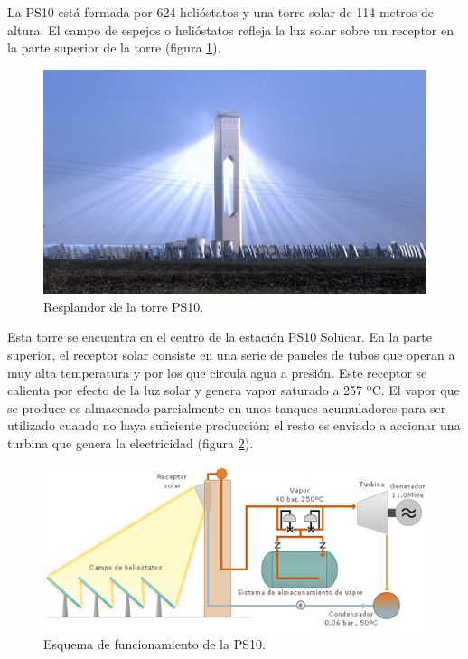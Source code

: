 La PS10 está formada por 624 helióstatos y una torre solar de 114 metros de altura. El campo de espejos o helióstatos refleja la luz solar sobre un receptor en la parte superior de la torre (figura \ref{fig:FotosPaginasWebHeliostatos/unnamed(5).jpg}).

\begin{figure}[h!]
  	\centering
	\includegraphics[width=\textwidth]{FotosPaginasWebHeliostatos/unnamed(5).jpg}
	\caption{Resplandor de la torre PS10.
	\label{fig:FotosPaginasWebHeliostatos/unnamed(5).jpg}}
\end{figure}

Esta torre se encuentra en el centro de la estación PS10 Solúcar. En la parte superior, el receptor solar consiste en una serie de paneles de tubos que operan a muy alta temperatura y por los que circula agua a presión. Este receptor se calienta por efecto de la luz solar y genera vapor saturado a 257 ºC. El vapor que se produce es almacenado parcialmente en unos tanques acumuladores para ser utilizado cuando no haya suficiente producción; el resto es enviado a accionar una turbina que genera la electricidad (figura \ref{fig:FotosPaginasWebHeliostatos/unnamed(7).jpg}).

\begin{figure}[h!]
  	\centering
	\includegraphics[width=\textwidth]{FotosPaginasWebHeliostatos/unnamed(7).jpg}
	\caption{Esquema de funcionamiento de la PS10.
	\label{fig:FotosPaginasWebHeliostatos/unnamed(7).jpg}}
\end{figure}

